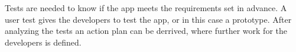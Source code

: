 Tests are needed to know if the app meets the requirements set in advance. A user test gives the developers to test the app, or in this case a prototype. After analyzing the tests an action plan can be derrived, where further work for the developers is defined. 
